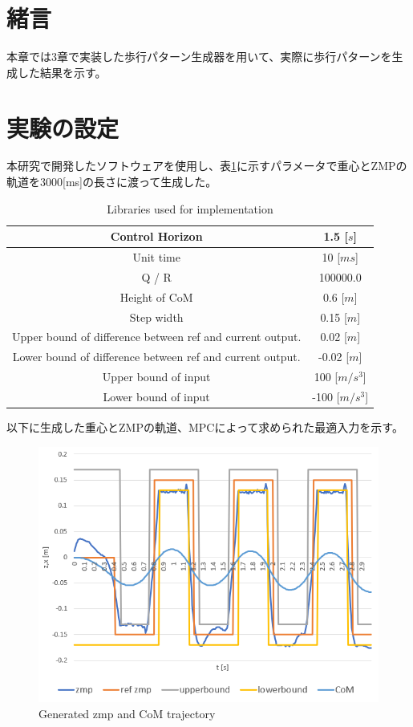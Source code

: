 \section{緒言}
本章では3章で実装した歩行パターン生成器を用いて、実際に歩行パターンを生成した結果を示す。
\section{実験の設定}
本研究で開発したソフトウェアを使用し、表\ref{tb:parametor}に示すパラメータで重心とZMPの軌道を3000[ms]の長さに渡って生成した。

\begin{table}[htbp]
  \centering
  \begin{tabular}{|c|c|} \hline
    Control Horizon & 1.5 [$s$] \\ \hline
    Unit time &10 [$ms$] \\ \hline
    Q / R  & 100000.0 \\ \hline
    Height of CoM & 0.6 [$m$] \\ \hline
    Step width & 0.15 [$m$] \\ \hline
    Upper bound of difference between ref and current output. & 0.02 [$m$] \\ \hline
    Lower bound of difference between ref and current output. & -0.02 [$m$] \\ \hline
    Upper bound of input & 100 [$m/s^{3}$] \\ \hline
    Lower bound of input & -100 [$m/s^{3}$] \\ \hline
  \end{tabular}
  \caption{Libraries used for implementation}
  \label{tb:parametor}
\end{table}

以下に生成した重心とZMPの軌道、MPCによって求められた最適入力を示す。

\begin{figure}[hbtp]
  \centering
 \includegraphics[keepaspectratio, scale=0.8]
      {images/zmp_trajectory.png}
 \caption{Generated zmp and CoM trajectory }
 \label{Fig:zmptrajectory}
\end{figure}

